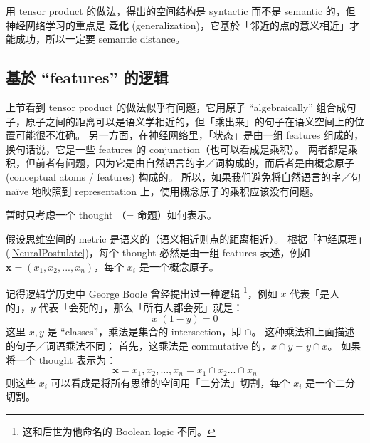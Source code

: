 \documentclass[orivec]{llncs}
\newcommand{\emp}[1]{\textbf{\textcolor{Cerulean}{#1}}}
\newcommand{\vect}[1]{\boldsymbol{#1}}
\begin{document}
用 tensor product 的做法，得出的空间结构是 syntactic 而不是 semantic 的，但神经网络学习的重点是 \emp{泛化} (generalization)，它基於「邻近的点的意义相近」才能成功，所以一定要 semantic distance。



\subsection{基於 ``features'' 的逻辑}

上节看到 tensor product 的做法似乎有问题，它用原子 ``algebraically'' 组合成句子，原子之间的距离可以是语义学相近的，但「乘出来」的句子在语义空间上的位置可能很不准确。 另一方面，在神经网络里，「状态」是由一组 features 组成的，换句话说，它是一些 features 的 conjunction（也可以看成是乘积）。 两者都是乘积，但前者有问题，因为它是由自然语言的字／词构成的，而后者是由概念原子 (conceptual atoms / features) 构成的。  所以，如果我们避免将自然语言的字／句 na\"{i}ve 地映照到 representation 上，使用概念原子的乘积应该没有问题。

暂时只考虑一个 thought （= 命题）如何表示。

假设思维空间的 metric 是语义的（语义相近则点的距离相近）。 根据「神经原理」(\ref{NeuralPostulate})，每个 thought 必然是由一组 features 表述，例如 $\vect{x} = (x_1, x_2, ..., x_n)$，每个 $x_i$ 是一个概念原子。 %

记得逻辑学历史中 George Boole 曾经提出过一种逻辑 \footnote{这和后世为他命名的 Boolean logic 不同。}，例如 $x$ 代表「是人的」，$y$ 代表「会死的」，那么「所有人都会死」就是：
\begin{equation}
x \; (1 - y) = 0
\end{equation}
这里 $x, y$ 是 ``classes''，乘法是集合的 intersection，即 $\cap$。 这种乘法和上面描述的句子／词语乘法不同； 首先，这乘法是 commutative 的，$x \cap y = y \cap x$。 如果将一个 thought 表示为：
\begin{equation}
\vect{x} = {x_1, x_2, ..., x_n} = x_1 \cap x_2 ... \cap x_n
\end{equation}
则这些 $x_i$ 可以看成是将所有思维的空间用「二分法」切割，每个 $x_i$ 是一个二分切割。 
\end{document}
